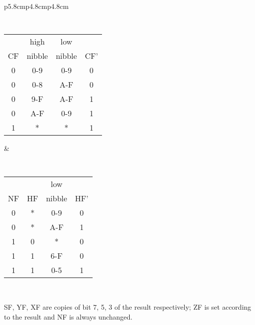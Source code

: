 {\begin{tabular}{p{5.8cm}p{4.8cm}p{4.8cm}}
        {\tt
            \begin{tabular}[t]{c|c|c|c}
                   & high   & low    & \\
                CF & nibble & nibble & CF' \\ 	
                \hline
                0 & 0-9    & 0-9    &  0  \\
                0 & 0-8    & A-F    &  0  \\
                0 & 9-F    & A-F    &  1  \\
                0 & A-F    & 0-9    &  1  \\
                1 &  *     &  *     &  1  \\ 
                \hline
            \end{tabular}
        }

        &
		
        {\tt
            \begin{tabular}[t]{c|c|c|c}
                   &    & low    & \\
                NF & HF & nibble & HF' \\ 
                \hline
                0 &  * & 0-9    &  0  \\
                0 &  * & A-F    &  1  \\
                1 &  0 &  *     &  0  \\
                1 &  1 & 6-F    &  0  \\
                1 &  1 & 0-5    &  1  \\ 
                \hline
            \end{tabular}
        }
		
        \\

    \end{tabular}
}

SF, YF, XF are copies of bit 7, 5, 3 of the result respectively; ZF is set according to the result and NF is always unchanged.


